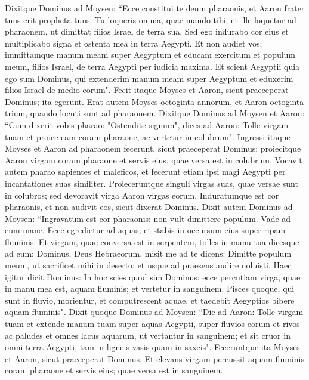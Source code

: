 \begin{biblechapter}  
\verse Dixitque Dominus ad Moysen: “Ecce constitui te deum pharaonis, et Aaron frater tuus erit propheta tuus. 
\verse Tu loqueris omnia, quae mando tibi; et ille loquetur ad pharaonem, ut dimittat filios Israel de terra sua. 
\verse Sed ego indurabo cor eius et multiplicabo signa et ostenta mea in terra Aegypti.  
\verse Et non audiet vos; immittamque manum meam super Aegyptum et educam exercitum et populum meum, filios Israel, de terra Aegypti per iudicia maxima. 
\verse Et scient Aegyptii quia ego sum Dominus, qui extenderim manum meam super Aegyptum et eduxerim filios Israel de medio eorum". 
\verse Fecit itaque Moyses et Aaron, sicut praeceperat Dominus; ita egerunt. 
\verse Erat autem Moyses octoginta annorum, et Aaron octoginta trium, quando locuti sunt ad pharaonem. 
\verse Dixitque Dominus ad Moysen et Aaron: 
\verse “Cum dixerit vobis pharao: "Ostendite signum", dices ad Aaron: Tolle virgam tuam et proice eam coram pharaone, ac vertetur in colubrum". 
\verse Ingressi itaque Moyses et Aaron ad pharaonem fecerunt, sicut praeceperat Dominus; proiecitque Aaron virgam coram pharaone et servis eius, quae versa est in colubrum. 
\verse Vocavit autem pharao sapientes et maleficos, et fecerunt etiam ipsi magi Aegypti per incantationes suas similiter. 
\verse Proieceruntque singuli virgas suas, quae versae sunt in colubros; sed devoravit virga Aaron virgas eorum.  
\verse Induratumque est cor pharaonis, et non audivit eos, sicut dixerat Dominus. 
\verse Dixit autem Dominus ad Moysen: “Ingravatum est cor pharaonis: non vult dimittere populum. 
\verse Vade ad eum mane. Ecce egredietur ad aquas; et stabis in occursum eius super ripam fluminis. Et virgam, quae conversa est in serpentem, tolles in manu tua 
\verse dicesque ad eum: Dominus, Deus Hebraeorum, misit me ad te dicens: Dimitte populum meum, ut sacrificet mihi in deserto; et usque ad praesens audire noluisti. 
\verse Haec igitur dicit Dominus: In hoc scies quod sim Dominus: ecce percutiam virga, quae in manu mea est, aquam fluminis; et vertetur in sanguinem. 
\verse Pisces quoque, qui sunt in fluvio, morientur, et computrescent aquae, et taedebit Aegyptios bibere aquam fluminis". 
\verse Dixit quoque Dominus ad Moysen: “Dic ad Aaron: Tolle virgam tuam et extende manum tuam super aquas Aegypti, super fluvios eorum et rivos ac paludes et omnes lacus aquarum, ut vertantur in sanguinem; et sit cruor in omni terra Aegypti, tam in ligneis vasis quam in saxeis". 
\verse Feceruntque ita Moyses et Aaron, sicut praeceperat Dominus. Et elevans virgam percussit aquam fluminis coram pharaone et servis eius; quae versa est in sanguinem. 

\end{biblechapter}

